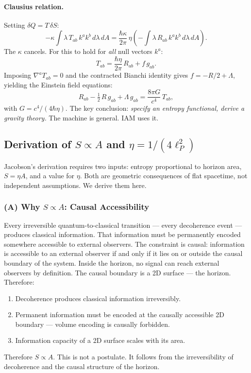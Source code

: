 \documentclass[12pt,a4paper]{article}
\begin{document}
\paragraph{Clausius relation.} Setting $\delta Q = T\,\delta S$:
\begin{equation}
-\kappa \int \lambda\,T_{ab}\,k^a k^b\,d\lambda\,dA
= \frac{\hbar\kappa}{2\pi}\,\eta
\left(-\int \lambda\,R_{ab}\,k^a k^b\,d\lambda\,dA\right).
\end{equation}
The $\kappa$ cancels. For this to hold for \textit{all} null vectors $k^a$:
\begin{equation}
T_{ab} = \frac{\hbar\eta}{2\pi}\,R_{ab} + f\,g_{ab}.
\end{equation}
Imposing $\nabla^a T_{ab} = 0$ and the contracted Bianchi identity gives
$f = -R/2 + \Lambda$, yielding the Einstein field equations:
\begin{equation}
\boxed{R_{ab} - \tfrac{1}{2}\,R\,g_{ab} + \Lambda\,g_{ab}
= \frac{8\pi G}{c^4}\,T_{ab},}
\label{eq:einstein}
\end{equation}
with $G = c^4/(4\hbar\eta)$. The key conclusion:
\textit{specify an entropy functional, derive a gravity theory.}
The machine is general. IAM uses it.

\subsection{Derivation of $S \propto A$ and $\eta = 1/(4\ell_P^2)$}
\label{sec:bekenstein_derivation}

Jacobson's derivation requires two inputs: entropy proportional to horizon
area, $S = \eta A$, and a value for $\eta$. Both are geometric consequences
of flat spacetime, not independent assumptions. We derive them here.

\subsubsection*{(A) Why $S \propto A$: Causal Accessibility}

Every irreversible quantum-to-classical transition --- every decoherence
event --- produces classical information. That information must be permanently
encoded somewhere accessible to external observers. The constraint is causal:
information is accessible to an external observer if and only if it lies on or
outside the causal boundary of the system. Inside the horizon, no signal can
reach external observers by definition. The causal boundary is a 2D surface
--- the horizon. Therefore:
\begin{enumerate}
\item Decoherence produces classical information irreversibly.
\item Permanent information must be encoded at the causally accessible 2D
  boundary --- volume encoding is causally forbidden.
\item Information capacity of a 2D surface scales with its area.
\end{enumerate}
Therefore $S \propto A$. This is not a postulate. It follows from the
irreversibility of decoherence and the causal structure of the horizon.
\end{document}

